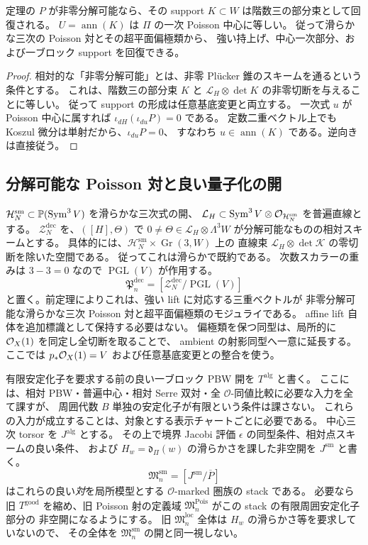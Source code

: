 \begin{corollary}
\label{cor:poisson-support-recovery}
定理の $P$ が非零分解可能なら、その support
$K\subset W$ は階数三の部分束として回復される。
$U=\operatorname{ann}(K)$ は $\Pi$ の一次 Poisson 中心に等しい。
従って滑らかな三次の Poisson 対とその超平面偏極類から、
強い持上げ、中心一次部分、および一ブロック support を回復できる。
\end{corollary}
\begin{proof}
相対的な「非零分解可能」とは、非零 Pl\"ucker 錐のスキームを通るという条件とする。
これは、階数三の部分束 $K$ と
$\mathcal L_H\otimes\det K$ の非零切断を与えることに等しい。
従って support の形成は任意基底変更と両立する。
一次式 $u$ が Poisson 中心に属すれば
$\iota_{dH}(\iota_{du}P)=0$ である。
定数二重ベクトル上でも Koszul 微分は単射だから、$\iota_{du}P=0$、
すなわち $u\in\operatorname{ann}(K)$ である。逆向きは直接従う。
\end{proof}

\subsection{分解可能な Poisson 対と良い量子化の開}

$\mathcal H_N^{\mathrm{sm}}\subset\mathbb P(\operatorname{Sym}^3V)$ を滑らかな三次式の開、
$\mathcal L_H\subset\operatorname{Sym}^3V\otimes\mathcal O_{\mathcal H_N^{\mathrm{sm}}}$ を普遍直線とする。
$\mathcal Z_N^{\mathrm{dec}}$ を、$([H],\Theta)$ で
$0\ne\Theta\in\mathcal L_H\otimes\Lambda^3W$ が分解可能なものの相対スキームとする。
具体的には、$\mathcal H_N^{\mathrm{sm}}\times\operatorname{Gr}(3,W)$ 上の
直線束 $\mathcal L_H\otimes\det\mathcal K$ の零切断を除いた空間である。
従ってこれは滑らかで既約である。
次数スカラーの重みは $3-3=0$ なので $\operatorname{PGL}(V)$ が作用する。
\[
 \mathfrak P_n^{\mathrm{dec}}
   =[\mathcal Z_N^{\mathrm{dec}}/\operatorname{PGL}(V)]
\]
と置く。前定理によりこれは、強い lift に対応する三重ベクトルが
非零分解可能な滑らかな三次 Poisson 対と超平面偏極類のモジュライである。
affine lift 自体を追加標識として保持する必要はない。
偏極類を保つ同型は、局所的に $\mathcal O_X(1)$ を同定し全切断を取ることで、
ambient の射影同型へ一意に延長する。
ここでは $p_*\mathcal O_X(1)=V$ および任意基底変更との整合を使う。

有限安定化子を要求する前の良い一ブロック PBW 開を
$T^{\mathrm{alg}}$ と書く。
ここには、相対 PBW・普遍中心・相対 Serre 双対・全
$\mathcal O$-同値比較に必要な入力を全て課すが、
周囲代数 $B$ 単独の安定化子が有限という条件は課さない。
これらの入力が成立することは、対象とする表示チャートごとに必要である。
中心三次 torsor を $J^{\mathrm{alg}}$ とする。
その上で境界 Jacobi 評価 $\epsilon$ の同型条件、相対点スキームの良い条件、
および $H_w=\mathfrak d_\Pi(w)$ の滑らかさを課した非空開を
$J^{\mathrm{sm}}$ と書く。
\[
 \mathfrak M_n^{\mathrm{sm}}=[J^{\mathrm{sm}}/\overline P]
\]
はこれらの良い\emph{対}を局所模型とする $\mathcal O$-marked 圏族の stack である。
必要なら旧 $T^{\mathrm{good}}$ を縮め、旧 Poisson 射の定義域
$\mathfrak M_n^{\mathrm{Pois}}$ がこの stack の有限周囲安定化子部分の
非空開になるようにする。
旧 $\mathfrak M_n^{\mathrm{loc}}$ 全体は $H_w$ の滑らかさ等を要求していないので、
その全体を $\mathfrak M_n^{\mathrm{sm}}$ の開と同一視しない。

